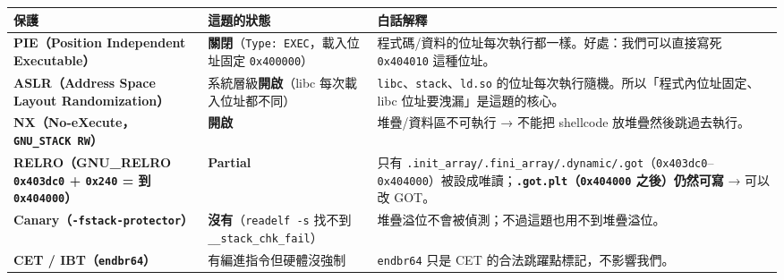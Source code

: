 \documentclass[10pt,a4paper]{article}
\newcounter{none}
\begin{document}
{\def\LTcaptype{none} %
\begin{longtable}[]{@{}
  >{\raggedright\arraybackslash}p{}
  >{\raggedright\arraybackslash}p{}
  >{\raggedright\arraybackslash}p{}@{}}
\toprule\noalign{}
\begin{minipage}[b]{\linewidth}\raggedright
保護
\end{minipage} & \begin{minipage}[b]{\linewidth}\raggedright
這題的狀態
\end{minipage} & \begin{minipage}[b]{\linewidth}\raggedright
白話解釋
\end{minipage} \\
\midrule\noalign{}
\endhead
\bottomrule\noalign{}
\endlastfoot
\textbf{PIE（Position Independent Executable）} &
\textbf{關閉}（\texttt{Type:\allowbreak{}\ \allowbreak{}EXEC}，載入位址固定 \texttt{0x400000}） &
程式碼/資料的位址每次執行都一樣。好處：我們可以直接寫死
\texttt{0x404010} 這種位址。 \\
\textbf{ASLR（Address Space Layout Randomization）} &
系統層級\textbf{開啟}（libc 每次載入位址都不同） &
\texttt{libc}、\texttt{stack}、\texttt{ld.\allowbreak{}so}
的位址每次執行隨機。所以「程式內位址固定、libc
位址要洩漏」是這題的核心。 \\
\textbf{NX（No-eXecute，\texttt{GNU\_\allowbreak{}STACK\ \allowbreak{}RW}）} & \textbf{開啟} &
堆疊/資料區不可執行 → 不能把 shellcode 放堆疊然後跳過去執行。 \\
\textbf{RELRO（GNU\_RELRO \texttt{0x403dc0} + \texttt{0x240} = 到
\texttt{0x404000}）} & \textbf{Partial} & 只有
\texttt{.\allowbreak{}init\_\allowbreak{}array/.\allowbreak{}fini\_\allowbreak{}array/.\allowbreak{}dynamic/.\allowbreak{}got}（\texttt{0x403dc0}--\texttt{0x404000}）被設成唯讀；\textbf{\texttt{.\allowbreak{}got.\allowbreak{}plt}（\texttt{0x404000}
之後）仍然可寫} → 可以改 GOT。 \\
\textbf{Canary（\texttt{-\allowbreak{}fstack-\allowbreak{}protector}）} &
\textbf{沒有}（\texttt{readelf\ \allowbreak{}-\allowbreak{}s} 找不到
\texttt{\_\allowbreak{}\_\allowbreak{}stack\_\allowbreak{}chk\_\allowbreak{}fail}） &
堆疊溢位不會被偵測；不過這題也用不到堆疊溢位。 \\
\textbf{CET / IBT（\texttt{endbr64}）} & 有編進指令但硬體沒強制 &
\texttt{endbr64} 只是 CET 的合法跳躍點標記，不影響我們。 \\
\end{longtable}
}
\end{document}
